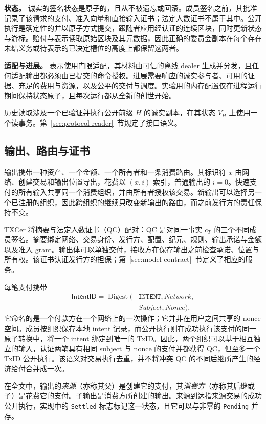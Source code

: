 \noindent\textbf{状态。}
诚实的签名状态是原子的，且从不被遗忘或回滚。成员签名之前，其批准记录了该请求的支付、准入向量和直接输入证书；法定人数证书不属于其中。公开执行是确定性的并以原子方式提交，跟随者应用经认证的连续区块，同时更新状态与游标。赔付与表示读取原始区块及其元数据，因此正确的委员会副本在每个存在未结义务或待表示的已决定槽位的高度上都保留这两者。

\noindent\textbf{适配与进展。}
表示使用门限适配，其材料由可信的离线 dealer 生成并分发，且任何适配输出都必须由已提交的命令授权。进展需要响应的诚实参与者、可用的证据、充足的费用与资源，以及公平的交付与调度。实验用的内存配置仅在进程运行期间保持状态原子，且每次运行都从全新的创世开始。

历史读取涉及一个已验证并执行公开前缀 $H$ 的诚实副本，在其状态 $V_H$ 上使用一个读事务。第~\ref{sec:protocol-reader}~节规定了接口语义。

\subsection{输出、路由与证书}
\label{sec:model-certificates}
输出携带一种资产、一个金额、一个所有者和一条消费路由。其标识符 $x$ 由网络、创建交易和输出位置导出，花费以 $(x,i)$ 索引，普通输出的 $i=0$。快速支付的所有输入共享同一个消费组织，并由所有者授权该交易。新输出可以选择另一个已注册的组织，因此跨组织的继续只改变新输出的路由，而之前发行方的责任保持不变。

TXCer 将摘要与法定人数证书（QC）配对：QC 是对同一事实 $c_T$ 的三个不同成员签名。摘要绑定网络、交易身份、发行方、配置、纪元、规则、输出承诺与金额以及准入 grant。输出体可以单独交付，接收方在保存输出之前检查承诺、位置与所有权。该证书认证发行方的担保；第~\ref{sec:model-contract}~节定义了相应的服务。

每笔支付携带
\[\begin{aligned}
\mathsf{IntentID}=\operatorname{Digest}(&\texttt{INTENT},\mathit{Network},\\
&\mathit{Subject},\mathit{Nonce}),
\end{aligned}\]
它命名的是一个付款方在一个网络上的一次操作；它并非在用户之间共享的 nonce 空间。成员按组织保存本地 intent 记录，而公开执行则在成功执行该支付的同一原子转换中，将一个 intent 绑定到唯一的 TxID。因此，两个组织可以基于相互独立的输入，认证两笔具有相同 subject 与 nonce 的支付并都获得 QC，但至多一个 TxID 公开执行。该语义对交易执行去重，并不将冲突 QC 的不同后继所产生的经济给付合并成一次。

在全文中，输出的\emph{来源}（亦称其父）是创建它的支付，其\emph{消费方}（亦称其后继或子）是花费它的支付。子输出是消费方所创建的输出。来源到达指来源交易的成功公开执行，实现中的 \texttt{Settled} 标志标记这一状态，且它可以与非零的 \texttt{Pending} 并存。

